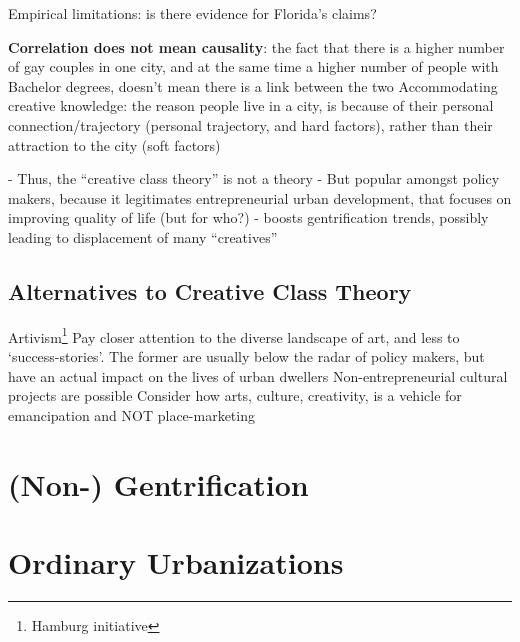 \documentclass{article}
\begin{document}
Empirical limitations: is there evidence for Florida's claims?

\begin{outline}
	\1 
		\2 \textbf{Correlation does not mean causality}: the fact that there is a higher number of gay couples in one city, and at the same time a higher number of people with Bachelor degrees, doesn't mean there is a link between the two
		\2 Accommodating creative knowledge: the reason people live in a city, is because of their personal connection/trajectory (personal trajectory, and hard factors), rather than their attraction to the city (soft factors)
\end{outline}

- Thus, the ``creative class theory'' is not a theory
- But popular amongst policy makers, because it legitimates entrepreneurial urban development, that focuses on improving quality of life (but for who?)
- boosts gentrification trends, possibly leading to displacement of many ``creatives''

\subsection{Alternatives to Creative Class Theory}

\begin{outline}
	\1 Artivism\footnote{Hamburg initiative}
	\1 Pay closer attention to the diverse landscape of art, and less to `success-stories'. The former are usually below the radar of policy makers, but have an actual impact on the lives of urban dwellers
	\1 Non-entrepreneurial cultural projects are possible
		\2 Consider how arts, culture, creativity, is a vehicle for emancipation and NOT place-marketing 
\end{outline}



\section{(Non-) Gentrification}


\section{Ordinary Urbanizations}

\end{document}
